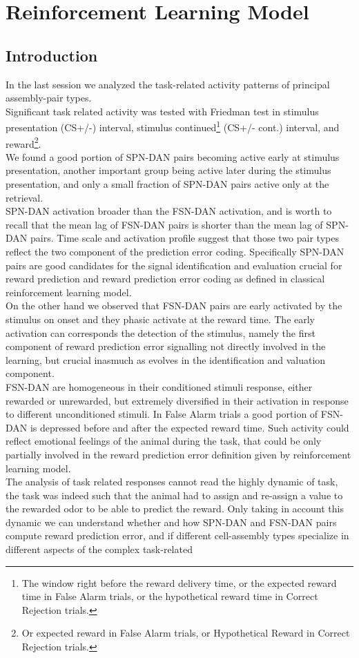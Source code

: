 \chapter{Reinforcement Learning Model}
\label{chap:RLModel}
\section{Introduction}
In the last session we analyzed the task-related activity patterns of principal assembly-pair types.\\Significant task related activity was tested with Friedman test in stimulus presentation (CS+/-) interval, stimulus continued\footnote{The window right before the reward delivery time, or the expected reward time in False Alarm trials, or the hypothetical reward time in Correct Rejection trials.} (CS+/- cont.) interval, and reward\footnote{Or expected reward in False Alarm trials, or Hypothetical Reward in Correct Rejection trials.}.\\We found a good portion of SPN-DAN pairs becoming active early at stimulus presentation, another important group being active later during the stimulus presentation, and only a small fraction of SPN-DAN pairs active only at the retrieval.\\SPN-DAN activation broader than the FSN-DAN activation, and is worth to recall that the mean lag of FSN-DAN pairs is shorter than the mean lag of SPN-DAN pairs. Time scale and activation profile suggest that those two pair types reflect the two component of the prediction error coding. Specifically SPN-DAN pairs are good candidates for the signal identification and evaluation crucial for reward prediction and reward prediction error coding as defined in classical reinforcement learning model.\\On the other hand we observed that FSN-DAN pairs are early activated by the stimulus on onset and they phasic activate at the reward time. The early activation can corresponds the detection of the stimulus, namely the first component of reward prediction error signalling not directly involved in the learning, but crucial inasmuch as evolves in the identification and valuation component.\\FSN-DAN are homogeneous in their conditioned stimuli response, either rewarded or unrewarded, but extremely diversified in their activation in response to different unconditioned stimuli. In False Alarm trials a good portion of FSN-DAN is depressed before and after the expected reward time. Such activity could reflect emotional feelings of the animal during the task, that could be only partially involved in the reward prediction error definition given by reinforcement learning model.\\The analysis of task related responses cannot read the highly dynamic of task, the task was indeed such that the animal had to assign and re-assign a value to the rewarded odor to be able to predict the reward. Only taking in account this dynamic we can understand whether and how SPN-DAN and FSN-DAN pairs compute reward prediction error, and if different cell-assembly types specialize in different aspects of the complex task-related 